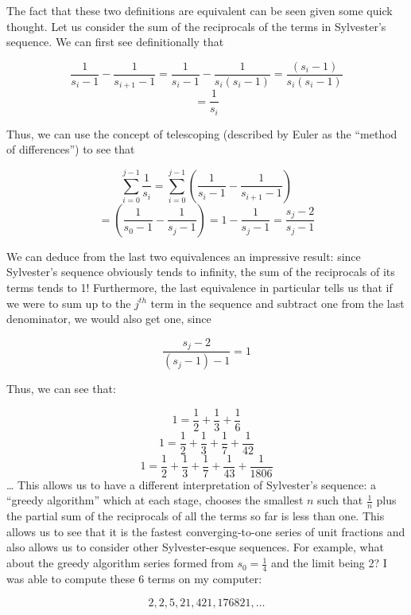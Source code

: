 \documentclass[11pt,a4paper]{report}
\begin{document}
	\begin{multicols}{2}
		
		The fact that these two definitions are equivalent can be seen given some quick thought. Let us consider the sum of the reciprocals of the terms in Sylvester’s sequence. We can first see definitionally that\par
		
		\[\frac{1}{s_i-1}-\frac{1}{s_{i+1}-1} = \frac{1}{s_i-1}-\frac{1}{s_i(s_i-1)} = \frac{(s_i-1)}{s_i(s_i-1)}\]
		\[ = \frac{1}{s_i}\]
		
		Thus, we can use the concept of telescoping (described by Euler as the “method of differences”) to see that\par
		
		\[\sum^{j-1}_{i=0} \frac{1}{s_i} = \sum^{j-1}_{i=0} (\frac{1}{s_i-1} -\frac{1}{s_{i+1}-1})\]
		\[ = (\frac{1}{s_0-1} -\frac{1}{s_{j}-1}) = 1 - \frac{1}{s_{j}-1} = \frac{s_j-2}{s_{j}-1} \]
		
		We can deduce from the last two equivalences an impressive result: since Sylvester’s sequence obviously tends to infinity, the sum of the reciprocals of its terms tends to 1! Furthermore, the last equivalence in particular tells us that if we were to sum up to the \(j^{th}\) term in the sequence and subtract one from the last denominator, we would also get one, since\par
		\[ \frac{s_j-2}{(s_{j}-1)-1} = 1\]
		
		Thus, we can see that:\par
		
		\[ 1 = \frac{1}{2}+\frac{1}{3}+\frac{1}{6}\]
		\[ 1 = \frac{1}{2}+\frac{1}{3}+\frac{1}{7}+\frac{1}{42}\]
		\[ 1 = \frac{1}{2}+\frac{1}{3}+\frac{1}{7}+\frac{1}{43}+\frac{1}{1806}\]
		…
		This allows us to have a different interpretation of Sylvester’s sequence: a “greedy algorithm” which at each stage, chooses the smallest \(n\) such that \(\frac{1}{n}\) plus the partial sum of the reciprocals of all the terms so far is less than one. This allows us to see that it is the fastest converging-to-one series of unit fractions and also allows us to consider other Sylvester-esque sequences. For example, what about the greedy algorithm series formed from \(s_0 = \frac{1}{4}\) and the limit being 2? I was able to compute these 6 terms on my computer:\par
		
		\[2, 2, 5, 21, 421, 176821, \ldots\]
		

\end{multicols}
\end{document}
